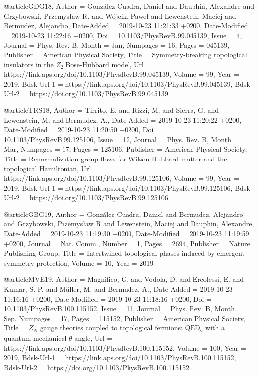 \documentclass[epj,final]{svjour}
\begin{document}
@article{GDG18,
	Author = {Gonz\'alez-Cuadra, Daniel and Dauphin, Alexandre and Grzybowski, Przemys\l{}aw R. and W\'ojcik, Pawe\l{} and Lewenstein, Maciej and Bermudez, Alejandro},
	Date-Added = {2019-10-23 11:21:33 +0200},
	Date-Modified = {2019-10-23 11:22:16 +0200},
	Doi = {10.1103/PhysRevB.99.045139},
	Issue = {4},
	Journal = {Phys. Rev. B},
	Month = {Jan},
	Numpages = {16},
	Pages = {045139},
	Publisher = {American Physical Society},
	Title = {Symmetry-breaking topological insulators in the {$Z_2$} Bose-Hubbard model},
	Url = {https://link.aps.org/doi/10.1103/PhysRevB.99.045139},
	Volume = {99},
	Year = {2019},
	Bdsk-Url-1 = {https://link.aps.org/doi/10.1103/PhysRevB.99.045139},
	Bdsk-Url-2 = {https://doi.org/10.1103/PhysRevB.99.045139}}

@article{TRS18,
	Author = {Tirrito, E. and Rizzi, M. and Sierra, G. and Lewenstein, M. and Bermudez, A.},
	Date-Added = {2019-10-23 11:20:22 +0200},
	Date-Modified = {2019-10-23 11:20:50 +0200},
	Doi = {10.1103/PhysRevB.99.125106},
	Issue = {12},
	Journal = {Phys. Rev. B},
	Month = {Mar},
	Numpages = {17},
	Pages = {125106},
	Publisher = {American Physical Society},
	Title = {Renormalization group flows for Wilson-Hubbard matter and the topological Hamiltonian},
	Url = {https://link.aps.org/doi/10.1103/PhysRevB.99.125106},
	Volume = {99},
	Year = {2019},
	Bdsk-Url-1 = {https://link.aps.org/doi/10.1103/PhysRevB.99.125106},
	Bdsk-Url-2 = {https://doi.org/10.1103/PhysRevB.99.125106}}

@article{GBG19,
	Author = {Gonz{\'a}lez-Cuadra, Daniel and Bermudez, Alejandro and Grzybowski, Przemys{\l}aw R and Lewenstein, Maciej and Dauphin, Alexandre},
	Date-Added = {2019-10-23 11:19:30 +0200},
	Date-Modified = {2019-10-23 11:19:59 +0200},
	Journal = {Nat. Comm.},
	Number = {1},
	Pages = {2694},
	Publisher = {Nature Publishing Group},
	Title = {Intertwined topological phases induced by emergent symmetry protection},
	Volume = {10},
	Year = {2019}}

@article{MVE19,
	Author = {Magnifico, G. and Vodola, D. and Ercolessi, E. and Kumar, S. P. and M\"uller, M. and Bermudez, A.},
	Date-Added = {2019-10-23 11:16:16 +0200},
	Date-Modified = {2019-10-23 11:18:16 +0200},
	Doi = {10.1103/PhysRevB.100.115152},
	Issue = {11},
	Journal = {Phys. Rev. B},
	Month = {Sep},
	Numpages = {17},
	Pages = {115152},
	Publisher = {American Physical Society},
	Title = {{$Z_N$} gauge theories coupled to topological fermions: ${\mathrm{QED}}_{2}$ with a quantum mechanical $\ensuremath{\theta}$ angle},
	Url = {https://link.aps.org/doi/10.1103/PhysRevB.100.115152},
	Volume = {100},
	Year = {2019},
	Bdsk-Url-1 = {https://link.aps.org/doi/10.1103/PhysRevB.100.115152},
	Bdsk-Url-2 = {https://doi.org/10.1103/PhysRevB.100.115152}}
\end{document}

